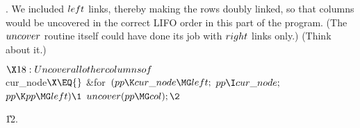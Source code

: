 . We included $\\{left}$ links, thereby making the rows doubly linked, so
that columns would be uncovered in the correct LIFO order in this
part of the program. (The $\\{uncover}$ routine itself could have done its
job with $\\{right}$ links only.) (Think about it.)

\Y\B\4$\X18:Uncover all other columns of $\\{cur\_node}$\X\EQ{}$\6
\&{for}~$(\\{pp}\K\\{cur\_node}\MG\\{left};$\5
$\\{pp}\I\\{cur\_node};$\5
$\\{pp}\K\\{pp}\MG\\{left})\1$\5
$\\{uncover}(\\{pp}\MG\\{col});\2$\par
\U 12.\fi

